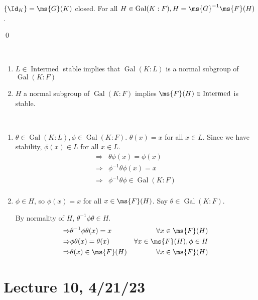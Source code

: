 \documentclass[x11names,reqno,14pt]{extarticle}
\DeclareMathOperator{\Gal}{Gal}
\DeclareMathOperator{\Intermed}{Intermed}
\begin{document}
\proof

$\{\Id_K\} = \ms{G}(K)$ closed. For all $H \in \Gal(K:F), H = \ms{G}^{-1}\ms{F}(H)$. 

\qed

\prop\,

\begin{enumerate}[label=(\alph*)]

\item $L \in \Intermed$ stable implies that $\Gal(K:L)$ is a normal subgroup of  $\Gal(K:F)$

\item $H$ a normal subgroup of $\Gal(K:F)$ implies $\ms{F}(H) \in \Intermed$ is stable. 

\end{enumerate}

\proof\,

\begin{enumerate}[label=(\alph*)]

\item $\theta\in\Gal(K:L),\phi\in\Gal(K:F)$. $\theta(x) = x$ for all $x \in L$. Since we have stability, $\phi(x) \in L$ for all $x \in L$. 
\begin{align*}
\Rightarrow &\theta\phi(x) = \phi(x) \\
\Rightarrow &\phi^{-1}\theta\phi(x) = x \\
\Rightarrow &\phi^{-1}\theta\phi \in \Gal(K:F) \\
\end{align*}

\item $\phi\in H$, so $\phi(x) = x$ for all $x \in \ms{F}(H)$. Say $\theta\in\Gal(K:F)$. 

By normality of $H$, $\theta^{-1}\phi\theta\in H$. 
\begin{align*}
\Rightarrow & \theta^{-1}\phi\theta(x) = x & \forall x \in \ms{F}(H) \\
\Rightarrow & \phi\theta(x) = \theta(x) & \forall x \in \ms{F}(H),\phi\in H \\
\Rightarrow & \theta(x) \in \ms{F}(H) & \forall x \in \ms{F}(H)
\end{align*}


\end{enumerate}

\section*{Lecture 10, 4/21/23}

\end{document}
